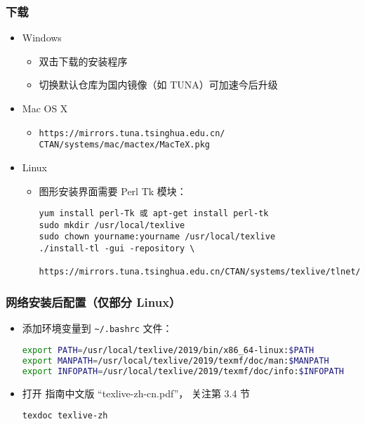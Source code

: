 \begin{frame}[fragile]
  \frametitle{下载}
  \begin{itemize}
    \item Windows
      \begin{itemize}
        \item 双击下载的安装程序
        \item 切换默认仓库为国内镜像（如 TUNA）可加速今后升级
      \end{itemize}
    \item Mac OS X
      \begin{itemize}
        \item \texttt{https://mirrors.tuna.tsinghua.edu.cn/\\CTAN/systems/mac/mactex/MacTeX.pkg}
      \end{itemize}
    \item Linux
      \begin{itemize}
        \item 图形安装界面需要 Perl Tk 模块：
          \begin{lstlisting}
yum install perl-Tk 或 apt-get install perl-tk
sudo mkdir /usr/local/texlive
sudo chown yourname:yourname /usr/local/texlive
./install-tl -gui -repository \
  https://mirrors.tuna.tsinghua.edu.cn/CTAN/systems/texlive/tlnet/
        \end{lstlisting}
      \end{itemize}
\end{itemize}
\end{frame}

\begin{frame}[fragile]
  \frametitle{网络安装后配置（仅部分 Linux）}
  \begin{itemize}
    \item
      添加环境变量到 \nolinkurl{~/.bashrc} 文件：
      \begin{lstlisting}[language=bash]
export PATH=/usr/local/texlive/2019/bin/x86_64-linux:$PATH
export MANPATH=/usr/local/texlive/2019/texmf/doc/man:$MANPATH
export INFOPATH=/usr/local/texlive/2019/texmf/doc/info:$INFOPATH
      \end{lstlisting}
  \item
    打开 \TeXLive 指南中文版 ``texlive-zh-cn.pdf''，
    关注第 3.4 节
      \begin{lstlisting}[basicstyle=\ttfamily]
texdoc texlive-zh
      \end{lstlisting}
  \end{itemize}
\end{frame}

